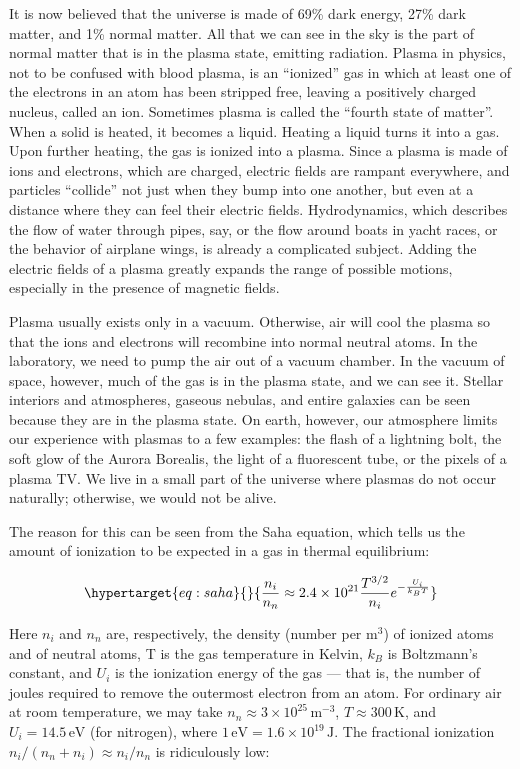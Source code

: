 \documentclass[
  notoc %
]{tufte-book}
\begin{document}
It is now believed that the universe is made of 69\% dark energy, 27\%
dark matter, and 1\% normal matter. All that we can see in the sky is
the part of normal matter that is in the plasma state, emitting
radiation. Plasma in physics, not to be confused with blood plasma, is
an ``ionized'' gas in which at least one of the electrons in an atom has
been stripped free, leaving a positively charged nucleus, called an ion.
Sometimes plasma is called the ``fourth state of matter''. When a solid
is heated, it becomes a liquid. Heating a liquid turns it into a gas.
Upon further heating, the gas is ionized into a plasma. Since a plasma
is made of ions and electrons, which are charged, electric fields are
rampant everywhere, and particles ``collide'' not just when they bump
into one another, but even at a distance where they can feel their
electric fields. Hydrodynamics, which describes the flow of water
through pipes, say, or the flow around boats in yacht races, or the
behavior of airplane wings, is already a complicated subject. Adding the
electric fields of a plasma greatly expands the range of possible
motions, especially in the presence of magnetic fields.

Plasma usually exists only in a vacuum. Otherwise, air will cool the
plasma so that the ions and electrons will recombine into normal neutral
atoms. In the laboratory, we need to pump the air out of a vacuum
chamber. In the vacuum of space, however, much of the gas is in the
plasma state, and we can see it. Stellar interiors and atmospheres,
gaseous nebulas, and entire galaxies can be seen because they are in the
plasma state. On earth, however, our atmosphere limits our experience
with plasmas to a few examples: the flash of a lightning bolt, the soft
glow of the Aurora Borealis, the light of a fluorescent tube, or the
pixels of a plasma TV. We live in a small part of the universe where
plasmas do not occur naturally; otherwise, we would not be alive.

The reason for this can be seen from the Saha equation, which tells us
the amount of ionization to be expected in a gas in thermal equilibrium:

\begin{equation}\protect\hypertarget{eq:saha}{}{
\frac{n_i}{n_n}\approx 2.4\times 10^{21}\frac{T^{3/2}}{n_i} e^{-\frac{U_i}{k_B T}}
}\label{eq:saha}\end{equation}

Here \(n_i\) and \(n_n\) are, respectively, the density (number per
\(\text{m}^3\)) of ionized atoms and of neutral atoms, T is the gas
temperature in Kelvin, \(k_B\) is Boltzmann's constant, and \(U_i\) is
the ionization energy of the gas --- that is, the number of joules
required to remove the outermost electron from an atom. For ordinary air
at room temperature, we may take
\(n_n\approx 3\times 10^{25}\,\text{m}^{-3}\),
\(T\approx 300\, \text{K}\), and \(U_i = 14.5\,\text{eV}\) (for
nitrogen), where \(1\,\text{eV} = 1.6\times 10^{19}\,\text{J}\). The
fractional ionization \(n_i/(n_n + n_i) \approx n_i/n_n\) is
ridiculously low:
\end{document}
